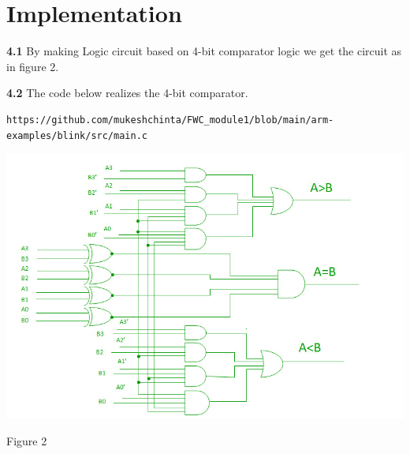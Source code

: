 \documentclass[10pt, a4paper]{article}
\begin{document}
\section{Implementation}
\textbf{4.1}
By making Logic circuit based on 4-bit comparator logic we get the circuit as in figure 2.

\textbf{4.2}
The code below realizes the 4-bit comparator.
\begin{lstlisting}
https://github.com/mukeshchinta/FWC_module1/blob/main/arm-examples/blink/src/main.c
\end{lstlisting}



 \begin{center}
\includegraphics[scale=.40]{4bit.jpg}

\end{center}
\begin{center}
    Figure 2
\end{center}
\end{document}
